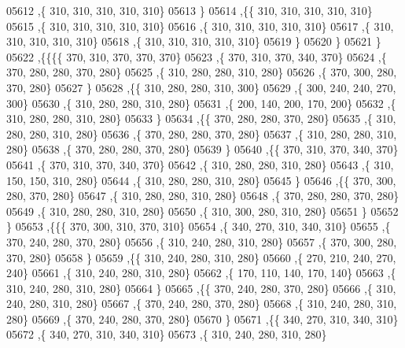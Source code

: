 \begin{DoxyCode}
05612     ,\{   310,   310,   310,   310,   310\}
05613     \}
05614    ,\{\{   310,   310,   310,   310,   310\}
05615     ,\{   310,   310,   310,   310,   310\}
05616     ,\{   310,   310,   310,   310,   310\}
05617     ,\{   310,   310,   310,   310,   310\}
05618     ,\{   310,   310,   310,   310,   310\}
05619     \}
05620    \}
05621   \}
05622  ,\{\{\{\{   370,   310,   370,   370,   370\}
05623     ,\{   370,   310,   370,   340,   370\}
05624     ,\{   370,   280,   280,   370,   280\}
05625     ,\{   310,   280,   280,   310,   280\}
05626     ,\{   370,   300,   280,   370,   280\}
05627     \}
05628    ,\{\{   310,   280,   280,   310,   300\}
05629     ,\{   300,   240,   240,   270,   300\}
05630     ,\{   310,   280,   280,   310,   280\}
05631     ,\{   200,   140,   200,   170,   200\}
05632     ,\{   310,   280,   280,   310,   280\}
05633     \}
05634    ,\{\{   370,   280,   280,   370,   280\}
05635     ,\{   310,   280,   280,   310,   280\}
05636     ,\{   370,   280,   280,   370,   280\}
05637     ,\{   310,   280,   280,   310,   280\}
05638     ,\{   370,   280,   280,   370,   280\}
05639     \}
05640    ,\{\{   370,   310,   370,   340,   370\}
05641     ,\{   370,   310,   370,   340,   370\}
05642     ,\{   310,   280,   280,   310,   280\}
05643     ,\{   310,   150,   150,   310,   280\}
05644     ,\{   310,   280,   280,   310,   280\}
05645     \}
05646    ,\{\{   370,   300,   280,   370,   280\}
05647     ,\{   310,   280,   280,   310,   280\}
05648     ,\{   370,   280,   280,   370,   280\}
05649     ,\{   310,   280,   280,   310,   280\}
05650     ,\{   310,   300,   280,   310,   280\}
05651     \}
05652    \}
05653   ,\{\{\{   370,   300,   310,   370,   310\}
05654     ,\{   340,   270,   310,   340,   310\}
05655     ,\{   370,   240,   280,   370,   280\}
05656     ,\{   310,   240,   280,   310,   280\}
05657     ,\{   370,   300,   280,   370,   280\}
05658     \}
05659    ,\{\{   310,   240,   280,   310,   280\}
05660     ,\{   270,   210,   240,   270,   240\}
05661     ,\{   310,   240,   280,   310,   280\}
05662     ,\{   170,   110,   140,   170,   140\}
05663     ,\{   310,   240,   280,   310,   280\}
05664     \}
05665    ,\{\{   370,   240,   280,   370,   280\}
05666     ,\{   310,   240,   280,   310,   280\}
05667     ,\{   370,   240,   280,   370,   280\}
05668     ,\{   310,   240,   280,   310,   280\}
05669     ,\{   370,   240,   280,   370,   280\}
05670     \}
05671    ,\{\{   340,   270,   310,   340,   310\}
05672     ,\{   340,   270,   310,   340,   310\}
05673     ,\{   310,   240,   280,   310,   280\}

\end{DoxyCode}
